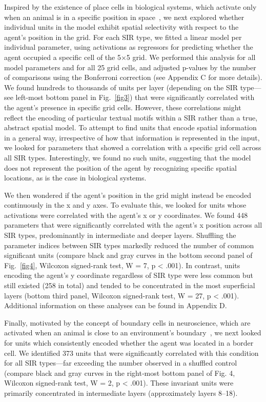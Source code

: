 \documentclass[runningheads]{llncs}
\begin{document}
Inspired by the existence of place cells in biological systems, which activate only when an animal is in a specific position in space~\cite{OKeefeDostrovsky1971,OKeefe1976}, we next explored whether individual units in the model exhibit spatial selectivity with respect to the agent’s position in the grid. For each SIR type, we fitted a linear model per individual parameter, using activations as regressors for predicting whether the agent occupied a specific cell of the 5×5 grid. We performed this analysis for all model parameters and for all 25 grid cells, and adjusted p-values by the number of comparisons using the Bonferroni correction (see Appendix C for more details). We found hundreds to thousands of units per layer (depending on the SIR type—see left-most bottom panel in Fig.~\ref{fig3}) that were significantly correlated with the agent’s presence in specific grid cells. However, these correlations might reflect the encoding of particular textual motifs within a SIR rather than a true, abstract spatial model. To attempt to find units that encode spatial information in a general way, irrespective of how that information is represented in the input, we looked for parameters that showed a correlation with a specific grid cell across all SIR types. Interestingly, we found no such units, suggesting that the model does not represent the position of the agent by recognizing specific spatial locations, as is the case in biological systems.

We then wondered if the agent’s position in the grid might instead be encoded continuously in the x and y axes. To evaluate this, we looked for units whose activations were correlated with the agent’s x or y coordinates. We found 448 parameters that were significantly correlated with the agent’s x position across all SIR types, predominantly in intermediate and deeper layers. Shuffling the parameter indices between SIR types markedly reduced the number of common significant units (compare black and gray curves in the bottom second panel of Fig.~\ref{fig4}, Wilcoxon signed-rank test, W = 7, p < .001). In contrast, units encoding the agent’s y coordinate regardless of SIR type were less common but still existed (258 in total) and tended to be concentrated in the most superficial layers (bottom third panel, Wilcoxon signed-rank test, W = 27, p < .001). Additional information on these analyses can be found in Appendix D.

Finally, motivated by the concept of boundary cells in neuroscience, which are activated when an animal is close to an environment’s boundary~\cite{Lever2009}, we next looked for units which consistently encoded whether the agent was located in a border cell. We identified 373 units that were significantly correlated with this condition for all SIR types—far exceeding the number observed in a shuffled control (compare black and gray curves in the right‑most bottom panel of Fig. 4, Wilcoxon signed-rank test, W = 2, p < .001). These invariant units were primarily concentrated in intermediate layers (approximately layers 8–18).
\end{document}
